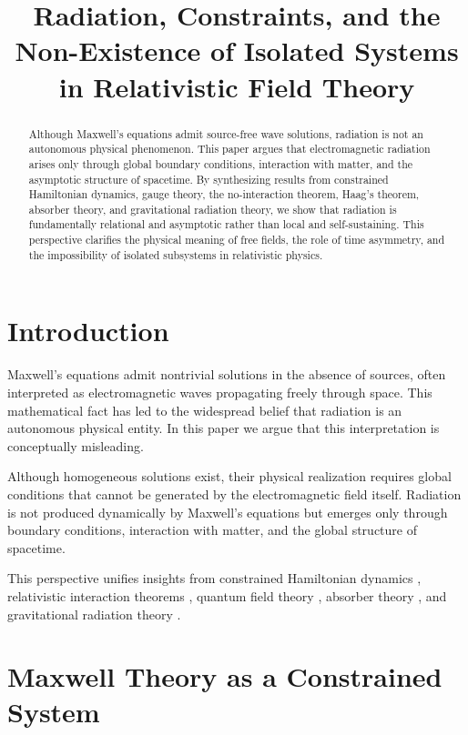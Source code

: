 \documentclass[11pt]{article}
\title{Radiation, Constraints, and the Non-Existence of Isolated Systems in Relativistic Field Theory}
\author{}
\date{}
\begin{document}
\maketitle

\begin{abstract}
Although Maxwell’s equations admit source-free wave solutions, radiation is not an autonomous physical phenomenon. This paper argues that electromagnetic radiation arises only through global boundary conditions, interaction with matter, and the asymptotic structure of spacetime. By synthesizing results from constrained Hamiltonian dynamics, gauge theory, the no-interaction theorem, Haag’s theorem, absorber theory, and gravitational radiation theory, we show that radiation is fundamentally relational and asymptotic rather than local and self-sustaining. This perspective clarifies the physical meaning of free fields, the role of time asymmetry, and the impossibility of isolated subsystems in relativistic physics.
\end{abstract}

\section{Introduction}

Maxwell’s equations admit nontrivial solutions in the absence of sources, often interpreted as electromagnetic waves propagating freely through space. This mathematical fact has led to the widespread belief that radiation is an autonomous physical entity. In this paper we argue that this interpretation is conceptually misleading.

Although homogeneous solutions exist, their physical realization requires global conditions that cannot be generated by the electromagnetic field itself. Radiation is not produced dynamically by Maxwell’s equations but emerges only through boundary conditions, interaction with matter, and the global structure of spacetime.

This perspective unifies insights from constrained Hamiltonian dynamics \cite{Dirac1964,HenneauxTeitelboim}, relativistic interaction theorems \cite{Currie1963}, quantum field theory \cite{Haag1992}, absorber theory \cite{WheelerFeynman1945}, and gravitational radiation theory \cite{Bondi1962,AshtekarStreubel}.

\section{Maxwell Theory as a Constrained System}
\end{document}
